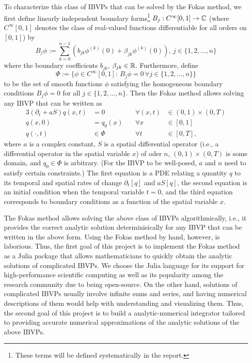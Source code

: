 \documentclass[11pt, oneside, a4paper]{article}
\begin{document}
To characterize this class of IBVPs that can be solved by the Fokas method\cite[p.9]{Smith2016}, we first define linearly independent boundary forms\footnote{These terms will be defined systematically in the report.} $B_j: C^\infty[0,1]\to \mathbb C$ (where $C^\infty[0,1]$ denotes the class of real-valued functions differentiable for all orders on $[0,1]$) by
\[B_j\phi := \sum_{k=0}^{n-1}\left(b_{jk}\phi^{(k)}(0) + \beta_{jk}\phi^{(k)}(0)\right),\, j\in\{1,2,\ldots,n\}\]
where the boundary coefficients $b_{jk}$, $\beta_{jk}\in\mathbb R$. Furthermore, define
\[\Phi:=\{\phi\in C^\infty[0,1]:\, B_j\phi = 0\,\forall j\in\{1,2,\ldots,n\}\}\]
to be the set of smooth functions $\phi$ satisfying the homogeneous boundary conditions $B_j\phi=0$ for all $j\in\{1,2,\ldots,n\}$.
Then the Fokas method allows solving any IBVP that can be written as
\begin{alignat*}{3}
    (\partial_t + aS)q(x,t) &= 0\quad &\forall (x,t)&\in (0,1)\times (0,T)\\
    q(x,0) &= q_0(x)\quad &\forall x&\in [0,1]\\
    q(\cdot, t) &\in \Phi \quad &\forall t&\in [0,T],
\end{alignat*}
where $a$ is a complex constant, $S$ is a spatial differential operator (i.e., a differential operator in the spatial variable $x$) of oder $n$, $(0,1)\times (0,T)$ is some domain, and $q_0\in \Phi$ is arbitrary. (For the IBVP to be well-posed, $a$ and $n$ need to satisfy certain constraints.) The first equation is a PDE relating a quantity $q$ to its temporal and spatial rates of change $\partial_t[q]$ and $aS[q]$, the second equation is an initial condition when the temporal variable $t=0$, and the third equation corresponds to boundary conditions as a function of the spatial variable $x$. 

The Fokas method allows solving the above class of IBVPs algorithmically, i.e., it provides the correct analytic solution determinisically for any IBVP that can be written in the above form. Using the Fokas method by hand, however, is laborious. Thus, the first goal of this project is to implement the Fokas method as a Julia package that allows mathematicians to quickly obtain the analytic solutions of complicated IBVPs. We choose the Julia language for its support for high-performance scientific computing as well as its popularity among the research community due to being open-source. On the other hand, solutions of complicated IBVPs usually involve infinite sums and series, and having numerical descriptions of them would help with understanding and visualizing them. Thus, the second goal of this project is to build a analytic-numerical integrator tailored to providing accurate numerical approximations of the analytic solutions of the above IBVPs.
\end{document}
